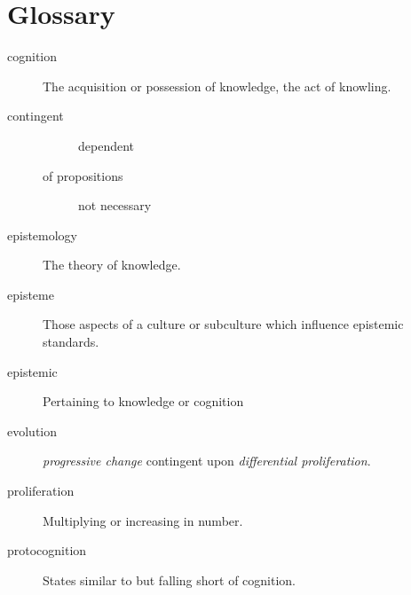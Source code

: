 \chapter{Glossary}\label{Glossary}


\begin{description}
\item[cognition]
  The acquisition or possession of knowledge, the act of knowling.
\item[contingent]
  \begin{description}
  \item[] dependent
  \item[of propositions] not necessary
    \end{description}
\item[epistemology]
  The theory of knowledge.  
\item[episteme]
  Those aspects of a culture or subculture which influence epistemic standards.
\item[epistemic]
  Pertaining to knowledge or cognition

\item[evolution]
  \emph{progressive change} contingent upon \emph{differential proliferation}.
\item[proliferation]
  Multiplying or increasing in number.
\item[protocognition]
    States similar to but falling short of cognition.
\end{description}



